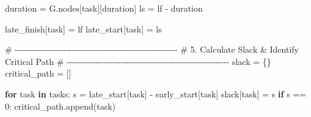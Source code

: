 \documentclass[
  letterpaper,
  DIV=11,
  numbers=noendperiod]{scrreprt}
\newenvironment{Shaded}{\begin{snugshade}}{\end{snugshade}}
\newcommand{\CommentTok}[1]{\textcolor[rgb]{0.37,0.37,0.37}{#1}}
\newcommand{\ControlFlowTok}[1]{\textcolor[rgb]{0.00,0.23,0.31}{\textbf{#1}}}
\newcommand{\DecValTok}[1]{\textcolor[rgb]{0.68,0.00,0.00}{#1}}
\newcommand{\KeywordTok}[1]{\textcolor[rgb]{0.00,0.23,0.31}{\textbf{#1}}}
\newcommand{\NormalTok}[1]{\textcolor[rgb]{0.00,0.23,0.31}{#1}}
\newcommand{\OperatorTok}[1]{\textcolor[rgb]{0.37,0.37,0.37}{#1}}
\newcommand{\StringTok}[1]{\textcolor[rgb]{0.13,0.47,0.30}{#1}}
\begin{document}
\begin{Shaded}
\begin{Highlighting}[]
\NormalTok{    duration }\OperatorTok{=}\NormalTok{ G.nodes[task][}\StringTok{\textquotesingle{}duration\textquotesingle{}}\NormalTok{]}
\NormalTok{    ls }\OperatorTok{=}\NormalTok{ lf }\OperatorTok{{-}}\NormalTok{ duration}
    
\NormalTok{    late\_finish[task] }\OperatorTok{=}\NormalTok{ lf}
\NormalTok{    late\_start[task] }\OperatorTok{=}\NormalTok{ ls}

\CommentTok{\# {-}{-}{-}{-}{-}{-}{-}{-}{-}{-}{-}{-}{-}{-}{-}{-}{-}{-}{-}{-}{-}{-}{-}{-}{-}{-}{-}{-}{-}{-}{-}{-}{-}{-}{-}{-}{-}{-}{-}{-}{-}{-}{-}{-}{-}{-}{-}{-}{-}{-}{-}{-}{-}{-}{-}{-}{-}}
\CommentTok{\# 5. Calculate Slack \& Identify Critical Path}
\CommentTok{\# {-}{-}{-}{-}{-}{-}{-}{-}{-}{-}{-}{-}{-}{-}{-}{-}{-}{-}{-}{-}{-}{-}{-}{-}{-}{-}{-}{-}{-}{-}{-}{-}{-}{-}{-}{-}{-}{-}{-}{-}{-}{-}{-}{-}{-}{-}{-}{-}{-}{-}{-}{-}{-}{-}{-}{-}{-}}
\NormalTok{slack }\OperatorTok{=}\NormalTok{ \{\}}
\NormalTok{critical\_path }\OperatorTok{=}\NormalTok{ []}

\ControlFlowTok{for}\NormalTok{ task }\KeywordTok{in}\NormalTok{ tasks:}
\NormalTok{    s }\OperatorTok{=}\NormalTok{ late\_start[task] }\OperatorTok{{-}}\NormalTok{ early\_start[task]}
\NormalTok{    slack[task] }\OperatorTok{=}\NormalTok{ s}
    \ControlFlowTok{if}\NormalTok{ s }\OperatorTok{==} \DecValTok{0}\NormalTok{:}
\NormalTok{        critical\_path.append(task)}


\end{Highlighting}
\end{Shaded}
\end{document}
